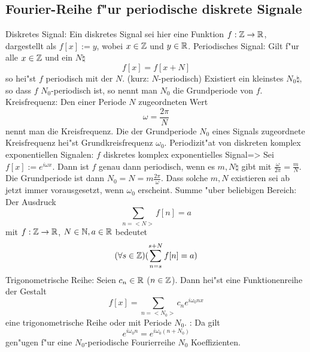 \subsection{Fourier-Reihe f"ur periodische diskrete Signale}
 Diskretes Signal:{
  Ein diskretes Signal sei hier eine Funktion $f:\mathbb Z\to\mathbb R$, 
  dargestellt als $f[x]:=y$, wobei $x\in\mathbb Z$ und $y\in\mathbb R$.
}
 Periodisches Signal:{
  Gilt f"ur alle $x\in\mathbb Z$ und ein $N\natural$
  \[
    f[x]=f[x+N]
  \]
  so hei"st $f$ periodisch mit der  $N$.
  (kurz: $N$-periodisch) Existiert ein kleinstes $N_0\natural$, so dass
  $f$ $N_0$-periodisch ist, so nennt man $N_0$ die Grundperiode von $f$.
}
 Kreisfrequenz:{
  Den einer Periode $N$ zugeordneten Wert
  \[
    \omega=\frac{2\pi}N
  \]
  nennt man die Kreisfrequenz. Die der Grundperiode $N_0$ eines Signals
  zugeordnete Kreisfrequenz hei"st Grundkreisfrequenz $\omega_0$.
}
\theorem Periodizit"at von diskreten komplex exponentiellen Signalen:
  $f$ diskretes komplex exponentielles Signal=>
{
  \label{the:discperiodicity}
  Sei $f[x]:=e^{i \omega x}$. Dann ist $f$ genau dann periodisch, wenn
  es $m,N\natural$ gibt mit $\frac{\omega}{2\pi}=\frac m N$. Die 
  Grundperiode ist dann $N_0=N=m\frac{2\pi}{\omega}$. Dass solche
  $m,N$ existieren sei ab jetzt immer vorausgesetzt, wenn $\omega_0$ 
  erscheint.
}
 Summe "uber beliebigen Bereich:{
  Der Ausdruck
  \[
    \sum_{n=<N>} f[n] = a
  \]
  mit $f:\mathbb Z\to\mathbb R$, $N\in\mathbb N,a\in\mathbb R$ bedeutet
  \[
    (\forall s\integer)(\sum_{n=s}^{s+N} f[n] = a)
  \]
}
 Trigonometrische Reihe:{
  Seien $c_n\in\mathbb R$ ($n\in\mathbb Z$). Dann hei"st eine Funktionenreihe der Gestalt
  \[
    f[x]=\sum_{n=<N_0>} c_n e^{i\omega_0 nx}
  \]
  eine trigonometrische Reihe oder  mit Periode $N_0$.
}
\remark:{
  Da gilt
  \[
    e^{i\omega_0 n}=e^{i\omega_0 (n+N_0)}
  \]
  gen"ugen f"ur eine $N_0$-periodische Fourierreihe $N_0$ Koeffizienten.
}
